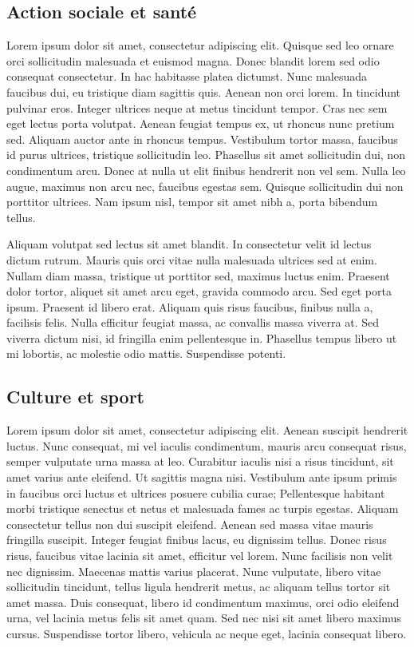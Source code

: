 \documentclass[a4paper,12pt]{report}
\begin{document}
\subsection{Action sociale et santé}  %
Lorem ipsum dolor sit amet, consectetur adipiscing elit. Quisque sed leo ornare orci sollicitudin malesuada et euismod magna. Donec blandit lorem sed odio consequat consectetur. In hac habitasse platea dictumst. Nunc malesuada faucibus dui, eu tristique diam sagittis quis. Aenean non orci lorem. In tincidunt pulvinar eros. Integer ultrices neque at metus tincidunt tempor. Cras nec sem eget lectus porta volutpat. Aenean feugiat tempus ex, ut rhoncus nunc pretium sed. Aliquam auctor ante in rhoncus tempus. Vestibulum tortor massa, faucibus id purus ultrices, tristique sollicitudin leo. Phasellus sit amet sollicitudin dui, non condimentum arcu. Donec at nulla ut elit finibus hendrerit non vel sem. Nulla leo augue, maximus non arcu nec, faucibus egestas sem. Quisque sollicitudin dui non porttitor ultrices. Nam ipsum nisl, tempor sit amet nibh a, porta bibendum tellus.

Aliquam volutpat sed lectus sit amet blandit. In consectetur velit id lectus dictum rutrum. Mauris quis orci vitae nulla malesuada ultrices sed at enim. Nullam diam massa, tristique ut porttitor sed, maximus luctus enim. Praesent dolor tortor, aliquet sit amet arcu eget, gravida commodo arcu. Sed eget porta ipsum. Praesent id libero erat. Aliquam quis risus faucibus, finibus nulla a, facilisis felis. Nulla efficitur feugiat massa, ac convallis massa viverra at. Sed viverra dictum nisi, id fringilla enim pellentesque in. Phasellus tempus libero ut mi lobortis, ac molestie odio mattis. Suspendisse potenti.

\subsection{Culture et sport }%
Lorem ipsum dolor sit amet, consectetur adipiscing elit. Aenean suscipit hendrerit luctus. Nunc consequat, mi vel iaculis condimentum, mauris arcu consequat risus, semper vulputate urna massa at leo. Curabitur iaculis nisi a risus tincidunt, sit amet varius ante eleifend. Ut sagittis magna nisi. Vestibulum ante ipsum primis in faucibus orci luctus et ultrices posuere cubilia curae; Pellentesque habitant morbi tristique senectus et netus et malesuada fames ac turpis egestas. Aliquam consectetur tellus non dui suscipit eleifend. Aenean sed massa vitae mauris fringilla suscipit. Integer feugiat finibus lacus, eu dignissim tellus. Donec risus risus, faucibus vitae lacinia sit amet, efficitur vel lorem. Nunc facilisis non velit nec dignissim. Maecenas mattis varius placerat. Nunc vulputate, libero vitae sollicitudin tincidunt, tellus ligula hendrerit metus, ac aliquam tellus tortor sit amet massa. Duis consequat, libero id condimentum maximus, orci odio eleifend urna, vel lacinia metus felis sit amet quam. Sed nec nisi sit amet libero maximus cursus. Suspendisse tortor libero, vehicula ac neque eget, lacinia consequat libero.
\end{document}
